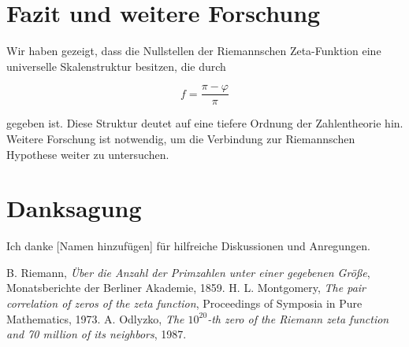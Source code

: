 \documentclass[12pt]{article}
\begin{document}
\section{Fazit und weitere Forschung}

Wir haben gezeigt, dass die Nullstellen der Riemannschen Zeta-Funktion eine universelle Skalenstruktur besitzen, die durch

\[
f = \frac{\pi - \varphi}{\pi}
\]

gegeben ist. Diese Struktur deutet auf eine tiefere Ordnung der Zahlentheorie hin.
Weitere Forschung ist notwendig, um die Verbindung zur Riemannschen Hypothese weiter zu untersuchen.

\section*{Danksagung}
Ich danke [Namen hinzufügen] für hilfreiche Diskussionen und Anregungen.

\begin{thebibliography}{9}
 B. Riemann, \textit{Über die Anzahl der Primzahlen unter einer gegebenen Größe}, Monatsberichte der Berliner Akademie, 1859.
 H. L. Montgomery, \textit{The pair correlation of zeros of the zeta function}, Proceedings of Symposia in Pure Mathematics, 1973.
 A. Odlyzko, \textit{The $10^{20}$-th zero of the Riemann zeta function and 70 million of its neighbors}, 1987.
\end{thebibliography}
\end{document}
